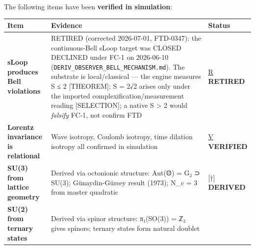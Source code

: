 \documentclass[
  11pt,
  letterpaper,
  twoside,
  openright]{book}
\begin{document}
\begin{tcolorbox}[enhanced jigsaw, coltitle=black, colbacktitle=quarto-callout-tip-color!10!white, toprule=.15mm, colframe=quarto-callout-tip-color-frame, arc=.35mm, opacityback=0, bottomtitle=1mm, toptitle=1mm, breakable, colback=white, titlerule=0mm, opacitybacktitle=0.6, title=\textcolor{quarto-callout-tip-color}{\faLightbulb}\hspace{0.5em}{Verified in Simulation}, rightrule=.15mm, bottomrule=.15mm, leftrule=.75mm, left=2mm]

The following items have been \textbf{verified in simulation}:

\begin{longtable}[]{@{}
  >{\raggedright\arraybackslash}p{}
  >{\raggedright\arraybackslash}p{}
  >{\raggedright\arraybackslash}p{}@{}}
\toprule\noalign{}
\begin{minipage}[b]{\linewidth}\raggedright
Item
\end{minipage} & \begin{minipage}[b]{\linewidth}\raggedright
Evidence
\end{minipage} & \begin{minipage}[b]{\linewidth}\raggedright
Status
\end{minipage} \\
\midrule\noalign{}
\endhead
\bottomrule\noalign{}
\endlastfoot
\textbf{sLoop produces Bell violations} & RETIRED (corrected 2026-07-01,
FTD-0347): the continuous-Bell sLoop target was CLOSED DECLINED under
FC-1 on 2026-06-10 (\texttt{DERIV\_OBSERVER\_BELL\_MECHANISM.md}). The
substrate is local/classical --- the engine measures S ≤ 2
{[}THEOREM{]}; S = 2√2 arises only under the imported
complexification/measurement reading {[}SELECTION{]}; a native S
\textgreater{} 2 would \emph{falsify} FC-1, not confirm FTD &
\hyperref[r]{R} \textbf{RETIRED} \\
\textbf{Lorentz invariance is relational} & Wave isotropy, Coulomb
isotropy, time dilation isotropy all confirmed in simulation &
\hyperref[v]{V} \textbf{VERIFIED} \\
\textbf{SU(3) from lattice geometry} & Derived via octonionic structure:
Aut(𝕆) = G₂ ⊃ SU(3); Günaydin-Gürsey result (1973); N\_c = 3 from master
quadratic & {[}†{]} \textbf{DERIVED} \\
\textbf{SU(2) from ternary states} & Derived via spinor structure:
π₁(SO(3)) = ℤ₂ gives spinors; ternary states form natural doublet &

\end{longtable}
\end{tcolorbox}
\end{document}
